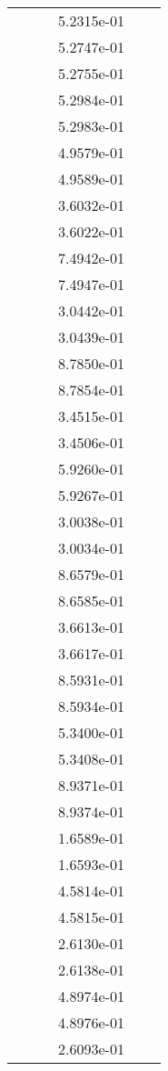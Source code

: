 \begin{xltabular}{\textwidth}{r|rS[table-format=1.3e+2]S[table-format=1.4e+2]S[table-format=1.4e+2]S[table-format=-1.5]}
&  &  & 5.2315e-01 & & \\
&  &  & 5.2747e-01 & & \\
&  &  & 5.2755e-01 & & \\
&  &  & 5.2984e-01 & & \\
&  &  & 5.2983e-01 & & \\
&  &  & 4.9579e-01 & & \\
&  &  & 4.9589e-01 & & \\
&  &  & 3.6032e-01 & & \\
&  &  & 3.6022e-01 & & \\
&  &  & 7.4942e-01 & & \\
&  &  & 7.4947e-01 & & \\
&  &  & 3.0442e-01 & & \\
&  &  & 3.0439e-01 & & \\
&  &  & 8.7850e-01 & & \\
&  &  & 8.7854e-01 & & \\
&  &  & 3.4515e-01 & & \\
&  &  & 3.4506e-01 & & \\
&  &  & 5.9260e-01 & & \\
&  &  & 5.9267e-01 & & \\
&  &  & 3.0038e-01 & & \\
&  &  & 3.0034e-01 & & \\
&  &  & 8.6579e-01 & & \\
&  &  & 8.6585e-01 & & \\
&  &  & 3.6613e-01 & & \\
&  &  & 3.6617e-01 & & \\
&  &  & 8.5931e-01 & & \\
&  &  & 8.5934e-01 & & \\
&  &  & 5.3400e-01 & & \\
&  &  & 5.3408e-01 & & \\
&  &  & 8.9371e-01 & & \\
&  &  & 8.9374e-01 & & \\
&  &  & 1.6589e-01 & & \\
&  &  & 1.6593e-01 & & \\
&  &  & 4.5814e-01 & & \\
&  &  & 4.5815e-01 & & \\
&  &  & 2.6130e-01 & & \\
&  &  & 2.6138e-01 & & \\
&  &  & 4.8974e-01 & & \\
&  &  & 4.8976e-01 & & \\
&  &  & 2.6093e-01 & & \\

\end{xltabular}
